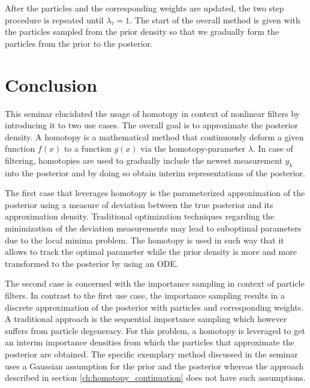 \documentclass[a4paper]{IEEEtran}
\begin{document}
After the particles and the corresponding weights are updated, the two step procedure is repeated until $\lambda_{\tau} = 1$. The start of the overall method is given with the particles sampled from the prior density so that we gradually form the particles from the prior to the posterior.



\section{Conclusion}
\label{ch:conclusion}
This seminar elucidated the usage of homotopy in context of nonlinear filters by introducing it to two use cases. The overall goal is to approximate the posterior density. 
A homotopy is a mathematical method that continuously deform a given function $f(x)$ to a function $g(x)$ via the homotopy-parameter $\lambda$.
In case of filtering, homotopies are used to gradually include the newest measurement $y_{k}$ into the posterior and by doing so obtain interim representations of the posterior.

The first case that leverages homotopy is the parameterized approximation of the posterior using a measure of deviation between the true posterior and its approximation density. Traditional optimization techniques regarding the minimization of the deviation measurements may lead to
suboptimal parameters due to the local minima problem. The homotopy is used in such way that it allows to track the optimal parameter while the prior density is more and more transformed to the posterior by using an ODE. 

The second case is concerned with the importance sampling in context of particle filters. In contrast to the first use case, the importance sampling results in a discrete approximation of the posterior with particles and corresponding weights.
A traditional approach is the sequential importance sampling which however suffers from particle degeneracy. For this problem, a homotopy is leveraged to get an interim importance densities from which the particles that approximate the posterior are obtained.
The specific exemplary method discussed in the seminar uses a Gaussian assumption for the prior and the posterior whereas the approach described in section \ref{ch:homotopy_continuation} does not have such assumptions.



\end{document}

